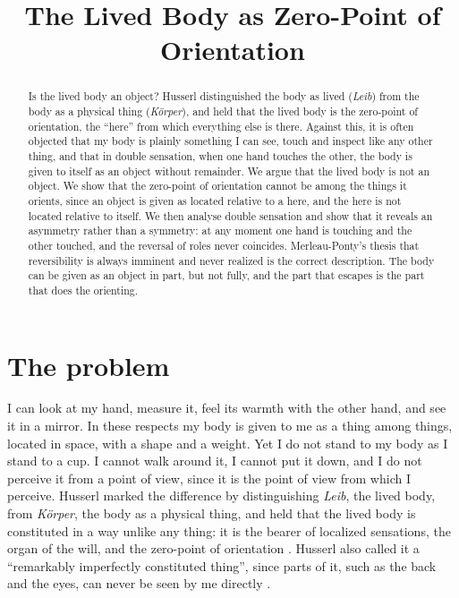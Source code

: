 \documentclass{situationist-preprint}
\title{The Lived Body as Zero-Point of Orientation}
\begin{document}
\maketitle

\begin{abstract}
Is the lived body an object? Husserl distinguished the body as lived (\emph{Leib}) from the body as a physical thing (\emph{K\"orper}), and held that the lived body is the zero-point of orientation, the \enquote{here} from which everything else is there. Against this, it is often objected that my body is plainly something I can see, touch and inspect like any other thing, and that in double sensation, when one hand touches the other, the body is given to itself as an object without remainder. We argue that the lived body is not an object. We show that the zero-point of orientation cannot be among the things it orients, since an object is given as located relative to a here, and the here is not located relative to itself. We then analyse double sensation and show that it reveals an asymmetry rather than a symmetry: at any moment one hand is touching and the other touched, and the reversal of roles never coincides. Merleau-Ponty's thesis that reversibility is always imminent and never realized is the correct description. The body can be given as an object in part, but not fully, and the part that escapes is the part that does the orienting.
\end{abstract}

\section{The problem}

I can look at my hand, measure it, feel its warmth with the other hand, and see it in a mirror. In these respects my body is given to me as a thing among things, located in space, with a shape and a weight. Yet I do not stand to my body as I stand to a cup. I cannot walk around it, I cannot put it down, and I do not perceive it from a point of view, since it is the point of view from which I perceive. Husserl marked the difference by distinguishing \emph{Leib}, the lived body, from \emph{K\"orper}, the body as a physical thing, and held that the lived body is constituted in a way unlike any thing: it is the bearer of localized sensations, the organ of the will, and the zero-point of orientation \citep[\S\S18, 36--42]{Husserl1952}. Husserl also called it a \enquote{remarkably imperfectly constituted thing}, since parts of it, such as the back and the eyes, can never be seen by me directly \citep[\S41]{Husserl1952}.
\end{document}
